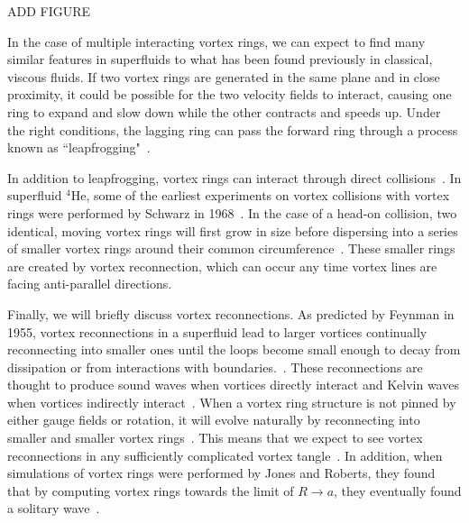 ADD FIGURE

In the case of multiple interacting vortex rings, we can expect to find many similar features in superfluids to what has been found previously in classical, viscous fluids. 
If two vortex rings are generated in the same plane and in close proximity, it could be possible for the two velocity fields to interact, causing one ring to expand and slow down while the other contracts and speeds up. 
Under the right conditions, the lagging ring can pass the forward ring through a process known as ``leapfrogging"~\cite{Sommerfield1950, Caplan2014}.

In addition to leapfrogging, vortex rings can interact through direct collisions~\cite{Shariff1992}. 
In superfluid $^4$He, some of the earliest experiments on vortex collisions with vortex rings were performed by Schwarz in 1968~\cite{Schwarz1968}.
In the case of a head-on collision, two identical, moving vortex rings will first grow in size before dispersing into a series of smaller vortex rings around their common circumference~\cite{Lim1995}. 
These smaller rings are created by vortex reconnection, which can occur any time vortex lines are facing anti-parallel directions.

Finally, we will briefly discuss vortex reconnections.
As predicted by Feynman in 1955, vortex reconnections in a superfluid lead to larger vortices continually reconnecting into smaller ones until the loops become small enough to decay from dissipation or from interactions with boundaries.~\cite{Feynman1955}.
These reconnections are thought to produce sound waves when vortices directly interact and Kelvin waves when vortices indirectly interact~\cite{Paoletti2011}.
When a vortex ring structure is not pinned by either gauge fields or rotation, it will evolve naturally by reconnecting into smaller and smaller vortex rings~\cite{Jackson1999}. 
This means that we expect to see vortex reconnections in any sufficiently complicated vortex tangle~\cite{Barenghi2014}.
In addition, when simulations of vortex rings were performed by Jones and Roberts, they found that by computing vortex rings towards the limit of $R \rightarrow a$, they eventually found a solitary wave~\cite{Jones1982, Berloff2005}.

